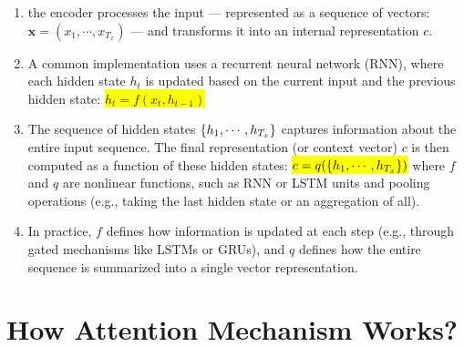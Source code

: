 \begin{enumerate}
    \item the encoder processes the input — represented as a sequence of vectors: $\bm{x}=(x_1,\cdots,x_{T_x})$ — and transforms it into an internal representation $c$.
    \hfill \cite{arxiv/1409.0473/NMT-Jointly-Learning-Align-Translate, common/online/chatgpt}

    \item A common implementation uses a recurrent neural network (RNN), where each hidden state $h_t$ is updated based on the current input and the previous hidden state: 
    \colorbox{yellow}{$h_t=f(x_t,h_{t-1})$}
    \hfill \cite{arxiv/1409.0473/NMT-Jointly-Learning-Align-Translate, common/online/chatgpt}

    \item The sequence of hidden states $\left\{h_1,\cdots,h_{T_x}\right\}$ captures information about the entire input sequence.
    The final representation (or context vector) $c$ is then computed as a function of these hidden states: \colorbox{yellow}{$c=q(\left\{h_1,\cdots,h_{T_x}\right\})$} 
    where $f$ and $q$ are nonlinear functions, such as RNN or LSTM units and pooling operations (e.g., taking the last hidden state or an aggregation of all).
    \hfill \cite{arxiv/1409.0473/NMT-Jointly-Learning-Align-Translate, common/online/chatgpt}

    \item In practice, $f$ defines how information is updated at each step (e.g., through gated mechanisms like LSTMs or GRUs), and $q$ defines how the entire sequence is summarized into a single vector representation.
    \hfill \cite{arxiv/1409.0473/NMT-Jointly-Learning-Align-Translate, common/online/chatgpt}
\end{enumerate}






\section{How Attention Mechanism Works?}

